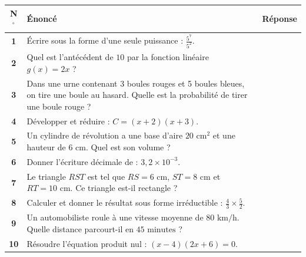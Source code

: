 \documentclass[a4paper,11pt]{article}
\begin{document}
\noindent
\begin{tabularx}{\textwidth}{|c|X|p{4cm}|}
\hline
\textbf{N$^{\circ}$} & \textbf{Énoncé} & \textbf{Réponse} \\ \hline
\textbf{1} & Écrire sous la forme d'une seule puissance : $\frac{5^7}{5^2}$. & \\ \hline
\textbf{2} & Quel est l'antécédent de $10$ par la fonction linéaire $g(x) = 2x$ ? & \\ \hline
\textbf{3} & Dans une urne contenant 3 boules rouges et 5 boules bleues, on tire une boule au hasard. Quelle est la probabilité de tirer une boule rouge ? & \\ \hline
\textbf{4} & Développer et réduire : $C = (x + 2)(x + 3)$. & \\ \hline
\textbf{5} & Un cylindre de révolution a une base d'aire $20\text{ cm}^2$ et une hauteur de $6\text{ cm}$. Quel est son volume ? & \\ \hline
\textbf{6} & Donner l'écriture décimale de : $3,2 \times 10^{-3}$. & \\ \hline
\textbf{7} & Le triangle $RST$ est tel que $RS = 6\text{ cm}$, $ST = 8\text{ cm}$ et $RT = 10\text{ cm}$. Ce triangle est-il rectangle ? & \\ \hline
\textbf{8} & Calculer et donner le résultat sous forme irréductible : $\frac{4}{3} \times \frac{5}{2}$. & \\ \hline
\textbf{9} & Un automobiliste roule à une vitesse moyenne de $80\text{ km/h}$. Quelle distance parcourt-il en $45\text{ minutes}$ ? & \\ \hline
\textbf{10} & Résoudre l'équation produit nul : $(x - 4)(2x + 6) = 0$. & \\ \hline
\end{tabularx}

\newpage
\end{document}
